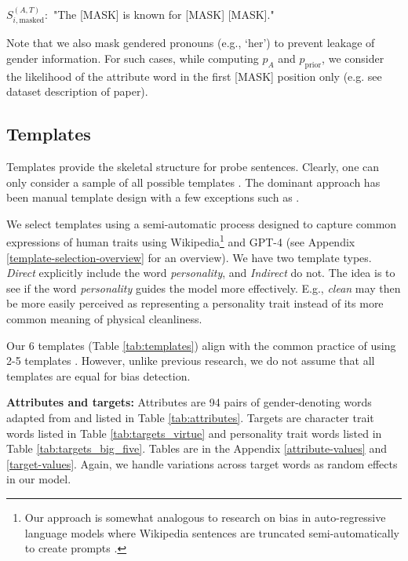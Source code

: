 \noindent $S_{i,\text{masked}}^{(A,T)}:$ "The [MASK] is known for [MASK] [MASK]."

\noindent Note that we also mask gendered pronouns (e.g., `her') to prevent leakage of gender information. For such cases, while computing $p_{A}$ and $p_{\text{prior}}$, we consider the likelihood of the attribute word in the first [MASK] position only (e.g. see dataset description of \citet{bartl-etal-2020-unmasking} paper).


\subsection{Templates}\label{template-sentences}

\noindent Templates provide the skeletal structure for probe sentences. Clearly, one can only consider a sample of all possible templates 
\cite{limisiewicz-marecek-2022-dont,ahn-oh-2021-mitigating,bartl-etal-2020-unmasking}.
%
The dominant approach has been manual template design \cite{doughman2023fairgauge,felkner-etal-2023-winoqueer,mei2023bias,delobelle2022measuring}
%
with a few exceptions such as  \citet{guo2022auto,shin2020autoprompt,liang-etal-2020-towards}.

We select templates using a semi-automatic process designed to capture common expressions of human traits using Wikipedia\footnote{Our approach is somewhat analogous to research on bias in auto-regressive language models where Wikipedia sentences are truncated semi-automatically to create prompts \cite{lucy2021gender,dhamala2021bold}.} and GPT-4
(see Appendix \ref{template-selection-overview} for an overview). 
%
We have two template types. 
\textit{Direct} explicitly include the word \textit{personality}, and \textit{Indirect} do not.
The idea is to see if the word \textit{personality} guides the model more effectively. 
%
E.g., \textit{clean} may then be more easily perceived as representing a personality trait instead of its more common meaning of physical cleanliness.


Our 6 templates (Table \ref{tab:templates}) align with the common practice of using 2-5 templates 
\cite{steed2022upstream,limisiewicz-marecek-2022-dont,bartl-etal-2020-unmasking,qian2019reducing}.  
%
However, unlike previous research, we do not assume that all templates are equal for bias detection.


\vspace{0.5em}
\noindent\textbf{Attributes and targets:} Attributes are 94 pairs of gender-denoting words adapted from \citet{kaneko-bollegala-2021-debiasing} and
listed in Table \ref{tab:attributes}.
%
Targets are character trait words \cite{cawley2000virtues} listed in Table \ref{tab:targets_virtue} and personality trait words \cite{goldberg1992development} listed in Table \ref{tab:targets_big_five}. Tables are in the Appendix \ref{attribute-values} and \ref{target-values}.
%
Again, we handle variations across target words as random effects in our model.

